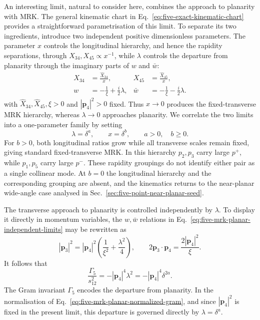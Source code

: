 \documentclass[a4paper,11pt]{article}
\begin{document}
An interesting limit, natural to consider here, combines the approach to
planarity with MRK.  The general kinematic chart in
Eq.~\eqref{eq:five-exact-kinematic-chart} provides a straightforward
parametrisation of this limit.  To separate its two ingredients, introduce
two independent positive dimensionless parameters.  The parameter \(x\)
controls the longitudinal hierarchy, and hence the rapidity separations,
through \(X_{34},X_{45}\propto x^{-1}\), while \(\lambda\) controls the
departure from planarity through the imaginary parts of \(w\) and
\(\bar w\):
\begin{align}
 X_{34}&=\frac{\widehat X_{34}}{x},&
 X_{45}&=\frac{\widehat X_{45}}{x},
 \nonumber\\
 w&=-\frac1\xi+\frac{i}{2}\lambda,&
 \bar w&=-\frac1\xi-\frac{i}{2}\lambda.
 \label{eq:five-mrk-planar-independent-limits}
\end{align}
with \(\widehat X_{34},\widehat X_{45},\xi>0\) and
\(|\mathbf p_4|^2>0\) fixed.  Thus \(x\to0\) produces the
fixed-transverse MRK hierarchy, whereas \(\lambda\to0\) approaches
planarity.  We correlate the two limits into a one-parameter family by
setting
\begin{equation}
 \lambda=\delta^a,\qquad x=\delta^b,\qquad a>0,\quad b\geq0.
 \label{eq:five-mrk-planar-correlated-rates}
\end{equation}
For \(b>0\), both longitudinal ratios grow while all transverse scales remain
fixed, giving standard fixed-transverse MRK.  In this hierarchy \(p_2,p_3\)
carry large \(p^+\), while \(p_1,p_5\) carry large \(p^-\).  These rapidity
groupings do not identify either pair as a single collinear mode.  At
\(b=0\) the longitudinal hierarchy and
the corresponding grouping are absent, and the kinematics returns to the
near-planar wide-angle case analysed in
Sec.~\ref{sec:five-point-near-planar-seed}.

The transverse approach to planarity is controlled independently by
\(\lambda\).  To display it directly in momentum variables, the
\(w,\bar w\) relations in
Eq.~\eqref{eq:five-mrk-planar-independent-limits} may be rewritten as
\begin{equation}
 |\mathbf p_3|^2=|\mathbf p_4|^2
 \left(\frac1{\xi^2}+\frac{\lambda^2}4\right),
 \qquad
 2\mathbf p_3\!\cdot\!\mathbf p_4=\frac{2|\mathbf p_4|^2}{\xi}.
 \label{eq:five-mrk-planar-transverse-chart}
\end{equation}
It follows that
\begin{equation}
 \frac{\Gamma_5}{s_{12}^2}
 =-|\mathbf p_4|^4\lambda^2
 =-|\mathbf p_4|^4\delta^{2a}.
 \label{eq:five-mrk-planar-normalized-gram}
\end{equation}
The Gram invariant \(\Gamma_5\) encodes the departure from planarity.  In the
normalisation of Eq.~\eqref{eq:five-mrk-planar-normalized-gram}, and since
\(|\mathbf p_4|^2\) is fixed in the present limit, this departure is governed
directly by \(\lambda=\delta^a\).
\end{document}
